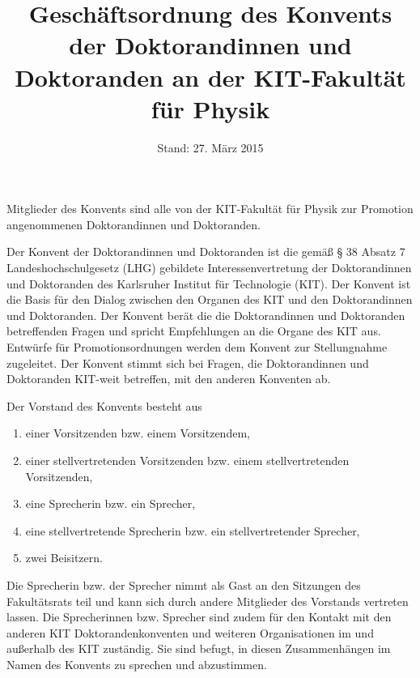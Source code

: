 \documentclass[a4paper, parskip=half, numbers=noenddot]{scrartcl}
\title{Geschäftsordnung des Konvents der Doktorandinnen und Doktoranden an der KIT-Fakultät für Physik}
\date{Stand: 27. März 2015}
\begin{document}
%
%

\maketitle



\begin{contract}


\tableofcontents


%
%





Mitglieder des Konvents sind alle von der KIT-Fakultät für Physik zur Promotion angenommenen Doktorandinnen und Doktoranden. 

%
\label{aufgaben}

Der Konvent der Doktorandinnen und Doktoranden ist die gemäß § 38 Absatz 7 Landeshochschulgesetz (LHG) gebildete Interessenvertretung der Doktorandinnen und Doktoranden des Karlsruher Institut für Technologie (KIT). Der Konvent ist die Basis für den Dialog zwischen den Organen des KIT und den Doktorandinnen und Doktoranden. Der Konvent berät die die Doktorandinnen und Doktoranden betreffenden Fragen und spricht Empfehlungen an die Organe des KIT aus. Entwürfe für Promotionsordnungen werden dem Konvent zur Stellungnahme zugeleitet. Der Konvent stimmt sich bei Fragen, die Doktorandinnen und Doktoranden KIT-weit betreffen, mit den anderen Konventen ab.



Der Vorstand des Konvents besteht aus
\begin{enumerate}
	\item einer Vorsitzenden bzw. einem Vorsitzendem,
	\item einer stellvertretenden Vorsitzenden bzw. einem stellvertretenden Vorsitzenden,
	\item eine Sprecherin bzw. ein Sprecher,
	\item eine stellvertretende Sprecherin bzw. ein stellvertretender Sprecher,
	\item zwei Beisitzern.
\end{enumerate}
Die Sprecherin bzw. der Sprecher nimmt als Gast an den Sitzungen des Fakultätsrats teil und
kann sich durch andere Mitglieder des Vorstands vertreten lassen.
Die Sprecherinnen bzw. Sprecher sind zudem für den Kontakt mit den anderen KIT Doktorandenkonventen und weiteren Organisationen im und außerhalb des KIT zuständig. Sie sind befugt, in diesen Zusammenhängen im Namen des Konvents zu sprechen und abzustimmen.


\end{contract}
\end{document}
